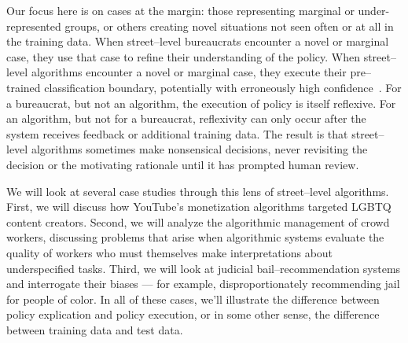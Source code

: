 \documentclass[main]{subfiles}
\begin{document}
Our focus here is on cases at the margin: those representing
marginal or under-represented groups, or
others creating novel situations not seen often or at all in the training data.
When street--level bureaucrats encounter a novel or marginal case,
they use that case to refine their understanding of the policy.
When street--level algorithms encounter a novel or marginal case,
they execute their pre--trained classification boundary,
potentially with erroneously high confidence~\cite{attenberg2011beat}.
For a bureaucrat, but not an algorithm, the execution of policy is itself reflexive.
For an algorithm, but not for a bureaucrat, reflexivity can only occur after the system receives feedback or additional training data.
The result is that street--level algorithms sometimes make nonsensical decisions,
never revisiting the decision or the motivating rationale until it has prompted human review.

We will look at several case studies through this lens of street--level algorithms.
First, we will discuss how YouTube's monetization algorithms targeted LGBTQ content creators.
Second,
we will analyze the algorithmic management of crowd workers,
discussing problems that arise when algorithmic systems evaluate the quality of workers
who must themselves make interpretations about underspecified tasks.
Third, we will look at judicial bail--recommendation systems and interrogate their biases
--- for example, disproportionately recommending jail for people of color.
In all of these cases,
we'll illustrate the difference between policy explication and policy execution, or
in some other sense, the difference between training data and test data.
\end{document}
